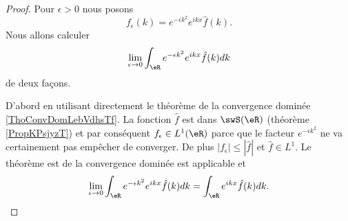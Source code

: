 \begin{proof}
    Pour \( \epsilon>0\) nous posons
    \begin{equation}
        f_{\epsilon}(k)= e^{-\epsilon k^2} e^{ikx}\hat f(k).
    \end{equation}
    Nous allons calculer
    \begin{equation}
        \lim_{\epsilon\to 0}\int_{\eR} e^{-\epsilon k^2} e^{ikx}\hat f(k)dk
    \end{equation}
    de deux façons.

    D'abord en utilisant directement le théorème de la convergence dominée \ref{ThoConvDomLebVdhsTf}. La fonction \( \hat f\) est dans \( \swS(\eR)\) (théorème \ref{PropKPsjyzT}) et par conséquent \( f_{\epsilon}\in L^1(\eR)\) parce que le facteur \(  e^{-\epsilon k^2}\) ne va certainement pas empêcher de converger. De plus \( | f_{\epsilon} |\leq | \hat f |\) et \( \hat f\in L^1\). Le théorème est de la convergence dominée est applicable et
    \begin{equation}        \label{EQooYIYGooXYubbW}
        \lim_{\epsilon\to 0}\int_{\eR} e^{-\epsilon k^2} e^{ikx}\hat f(k)dk=\int_{\eR} e^{ikx}\hat f(k)dk.
    \end{equation}
    

\end{proof}
